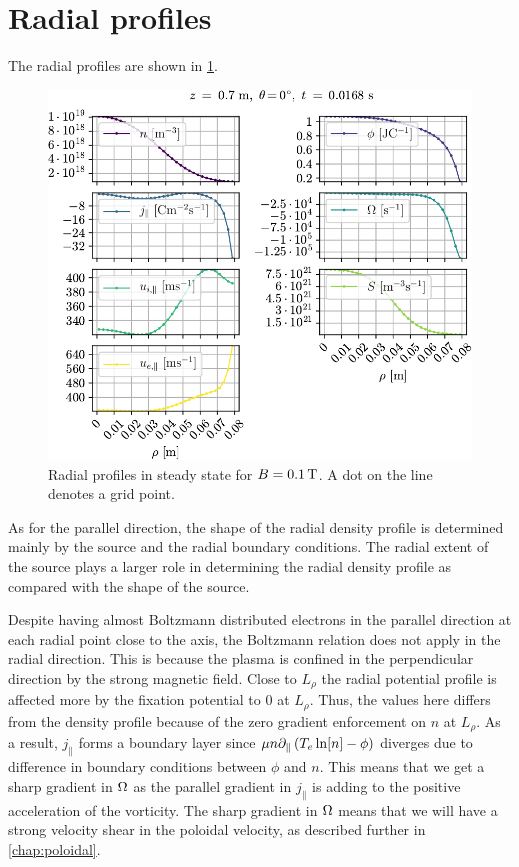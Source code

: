 \section{Radial profiles}
%
The radial profiles are shown in \cref{fig:radProfs}.
%
\begin{figure}[htb]
    \centering
    \includegraphics{fig/results/1DProfiles/B010Rad}
    \caption{Radial profiles in steady state for $B=0.1\, \text{T}$.
        A dot on the line denotes a grid point.
    }
    \label{fig:radProfs}
\end{figure}
%
As for the parallel direction, the shape of the radial density profile is determined mainly by the source and the radial boundary conditions.
The radial extent of the source plays a larger role in determining the radial density profile as compared with the shape of the source.

Despite having almost Boltzmann distributed electrons in the parallel direction at each radial point close to the axis, the Boltzmann relation does not apply in the radial direction.
This is because the plasma is confined in the perpendicular direction by the strong magnetic field.
Close to $L_\rho$ the radial potential profile is affected more by the fixation potential to $0$ at $L_\rho$.
Thus, the values here differs from the density profile because of the zero gradient enforcement on $n$ at $L_\rho$.
As a result, $j_\|$ forms a boundary layer since $\mu n \partial_\|\left(T_e\ln[n]-\phi\right)$ diverges due to difference in boundary conditions between $\phi$ and $n$.
This means that we get a sharp gradient in $\Omega$ as the parallel gradient in $j_\|$ is adding to the positive acceleration of the vorticity.
The sharp gradient in $\Omega$ means that we will have a strong velocity shear in the poloidal velocity, as described further in \cref{chap:poloidal}.

